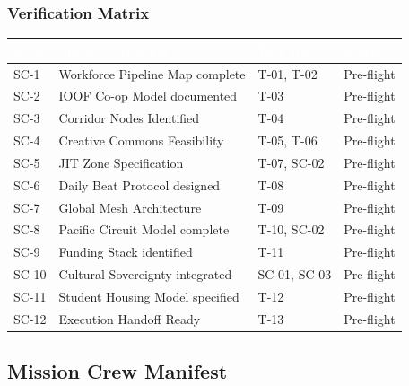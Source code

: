 \documentclass[11pt,letterpaper]{article}
\newcommand{\tableheader}[1]{\textbf{\sffamily\textcolor{white}{#1}}}
\begin{document}
\subsubsection{Verification Matrix}

\begin{center}
\begin{tabularx}{\textwidth}{C{1cm}L{5cm}L{3cm}C{2cm}}
\toprule
{}
\tableheader{SC\#} & \tableheader{Success Criterion} & \tableheader{Test IDs} & \tableheader{Status} \\
\midrule
SC-1 & Workforce Pipeline Map complete & T-01, T-02 & Pre-flight \\
SC-2 & IOOF Co-op Model documented & T-03 & Pre-flight \\
SC-3 & Corridor Nodes Identified & T-04 & Pre-flight \\
SC-4 & Creative Commons Feasibility & T-05, T-06 & Pre-flight \\
SC-5 & JIT Zone Specification & T-07, SC-02 & Pre-flight \\
SC-6 & Daily Beat Protocol designed & T-08 & Pre-flight \\
SC-7 & Global Mesh Architecture & T-09 & Pre-flight \\
SC-8 & Pacific Circuit Model complete & T-10, SC-02 & Pre-flight \\
SC-9 & Funding Stack identified & T-11 & Pre-flight \\
SC-10 & Cultural Sovereignty integrated & SC-01, SC-03 & Pre-flight \\
SC-11 & Student Housing Model specified & T-12 & Pre-flight \\
SC-12 & Execution Handoff Ready & T-13 & Pre-flight \\
\bottomrule
\end{tabularx}
\end{center}

\subsection{Mission Crew Manifest}
\end{document}

